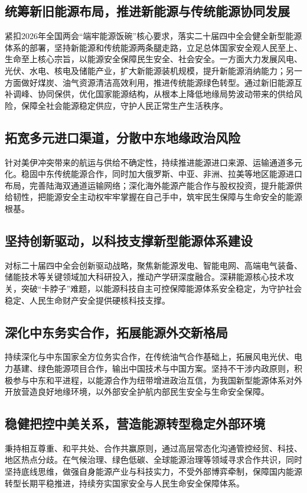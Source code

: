\documentclass[12pt,a4paper,UTF8]{article}
\begin{document}
\subsection{统筹新旧能源布局，推进新能源与传统能源协同发展}
紧扣2026年全国两会“端牢能源饭碗”核心要求，落实二十届四中全会健全新型能源体系的部署，坚持新能源和传统能源两条腿走路，立足总体国家安全观人民至上、生命至上核心宗旨，以能源安全保障民生安全、社会安全。一方面大力发展风电、光伏、水电、核电及储能产业，扩大新能源装机规模，提升新能源消纳能力；另一方面做好煤炭、油气资源清洁高效利用，推进传统能源绿色转型。通过新旧能源互补调峰、协同保供，优化国家能源结构，从根本上降低地缘局势波动带来的供给风险，保障全社会能源稳定供应，守护人民正常生产生活秩序。

\subsection{拓宽多元进口渠道，分散中东地缘政治风险}
针对美伊冲突带来的航运与供给不确定性，持续推进能源进口来源、运输通道多元化。稳固中东传统能源合作，同时加大俄罗斯、中亚、非洲、拉美等地区能源进口布局，完善陆海双通道运输网络；深化海外能源产能合作与股权投资，提升能源供给韧性，把能源安全主动权牢牢掌握在自己手中，筑牢民生保障与生命安全的能源根基。

\subsection{坚持创新驱动，以科技支撑新型能源体系建设}
对标二十届四中全会创新驱动战略，聚焦新能源发电、智能电网、高端电气装备、储能技术等关键领域加大科研投入，推动产学研深度融合。深耕能源核心技术攻关，突破“卡脖子”难题，以能源科技自主可控保障能源体系安全稳定，为守护社会稳定、人民生命财产安全提供硬核科技支撑。

\subsection{深化中东务实合作，拓展能源外交新格局}
持续深化与中东国家全方位务实合作，在传统油气合作基础上，拓展风电光伏、电力基建、绿色能源项目合作，输出中国技术与中国方案。坚持不干涉内政原则，积极参与中东和平进程，以能源合作为纽带增进政治互信，为我国新型能源体系对外开放营造良好地缘环境，以外部安全护航内部民生安全与生命安全保障。

\subsection{稳健把控中美关系，营造能源转型稳定外部环境}
秉持相互尊重、和平共处、合作共赢原则，通过高层常态化沟通管控经贸、科技、地区热点分歧。在气候治理、绿色低碳、全球能源治理等领域寻求合作共识，同时坚持底线思维，做强自身能源产业与科技实力，不受外部博弈牵制，保障国内能源转型长期平稳推进，持续夯实国家安全与人民生命安全保障体系。
\end{document}
